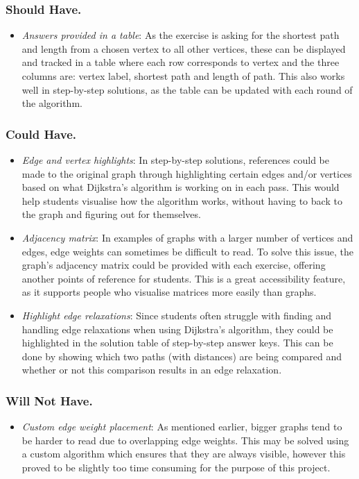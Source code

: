 \documentclass{l4proj}
\begin{document}
\subsubsection{Should Have.}
\begin{itemize}
	\item
	\emph{Answers provided in a table}: As the exercise is asking for the shortest path and length from a chosen vertex to all other vertices, these can be displayed and tracked in a table where each row corresponds to vertex and the three columns are: vertex label, shortest path and length of path. This also works well in step-by-step solutions, as the table can be updated with each round of the algorithm.
\end{itemize}
\subsubsection{Could Have.}
\begin{itemize}
	\item
	\emph{Edge and vertex highlights}: In step-by-step solutions, references could be made to the original graph through highlighting certain edges and/or vertices based on what Dijkstra's algorithm is working on in each pass. This would help students visualise how the algorithm works, without having to back to the graph and figuring out for themselves.
	\item
	\emph{Adjacency matrix}: In examples of graphs with a larger number of vertices and edges, edge weights can sometimes be difficult to read. To solve this issue, the graph's adjacency matrix could be provided with each exercise, offering another points of reference for students. This is a great accessibility feature, as it supports people who visualise matrices more easily than graphs.
	\item
	\emph{Highlight edge relaxations}: Since students often struggle with finding and handling edge relaxations \cite{} when using Dijkstra's algorithm, they could be highlighted in the solution table of step-by-step answer keys. This can be done by showing which two paths (with distances) are being compared and whether or not this comparison results in an edge relaxation.
\end{itemize}
\subsubsection{Will Not Have.}
\begin{itemize}
	\item
	\emph{Custom edge weight placement}: As mentioned earlier, bigger graphs tend to be harder to read due to overlapping edge weights. This may be solved using a custom algorithm which ensures that they are always visible, however this proved to be slightly too time consuming for the purpose of this project.
\end{itemize}
\end{document}
